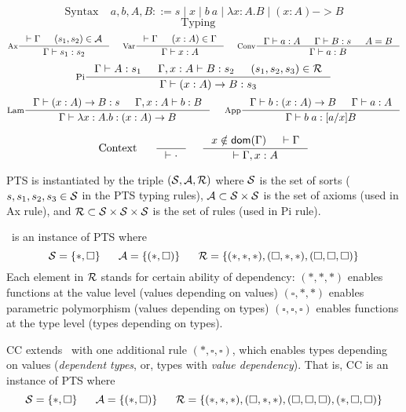 \[\text{Syntax}~~~~~ a,b,A,B ::= s \mid x \mid b~a \mid \lambda x:A.B
                                   \mid (x:A) -> B \]
\[\text{Typing}~~~~~\]
\[
 \inference[Ax]{|-\Gamma & (s_1,s_2)\in\calA}{\Gamma |- s_1 : s_2}
 ~~~~
 \inference[Var]{|-\Gamma & (x:A)\in\Gamma}{\Gamma |- x:A} 
 ~~~~
 \inference[Conv]{\Gamma |- a:A & \Gamma |- B:s & A=B}{\Gamma |- a:B}
\]
\[
 \inference[Pi]{\Gamma |- A:s_1 & \Gamma,x:A |- B:s_2 & (s_1,s_2,s_3)\in\calR}
               {\Gamma |- (x:A)-> B : s_3}
\]
\[
 \inference[Lam]{\Gamma |- (x:A)-> B : s & \Gamma,x:A |- b:B}
                {\Gamma |- \lambda x:A.b : (x:A)-> B}
 ~~~~
 \inference[App]{\Gamma |- b:(x:A)-> B & \Gamma |- a:A}{\Gamma |- b\;a:[a/x]B}
\]

\[\text{Context}~~~~~
 \inference{}{|-\cdot}
 ~~~~
 \inference{x\notin\dom(\Gamma) & |-\Gamma}{|-\Gamma,x:A}
\]

PTS is instantiated by the triple $(\mathcal{S},\mathcal{A},\mathcal{R})$ where
$\mathcal{S}$ is the set of sorts ($s,s_1,s_2,s_3\in\mathcal{S}$ in the PTS typing rules),
$\mathcal{A}\subset\mathcal{S}\times\mathcal{S}$ is the set of axioms (used in Ax rule), and
$\mathcal{R}\subset\mathcal{S}\times\mathcal{S}\times\mathcal{S}$ is the set of rules (used in Pi rule).

\Fw\ is an instance of PTS where
\[\mathcal{S}=\{*,\square\}
  ~~~~~
  \mathcal{A}=\{(*,\square)\}
  ~~~~~
  \mathcal{R}=\{(*,*,*),(\square,*,*),(\square,\square,\square)\}
\]
Each element in $\mathcal{R}$ stands for certain ability of dependency:
$(*,*,*)$ enables functions at the value level
(values depending on values)
$(\square,*,*)$ enables parametric polymorphism
(values depending on types)
$(\square,\square,\square)$ enables functions at the type level
(types depending on types).

CC extends \Fw\ with one additional rule
$(*,\square,\square)$, which enables types depending on values
(\emph{dependent types}, or, types with \emph{value dependency}).
That is, CC is an instance of PTS where
\[\mathcal{S}=\{*,\square\}
  ~~~~~
  \mathcal{A}=\{(*,\square)\}
  ~~~~~
  \mathcal{R}=\{(*,*,*),(\square,*,*),(\square,\square,\square)
         ,(*,\square,\square)\}\]


